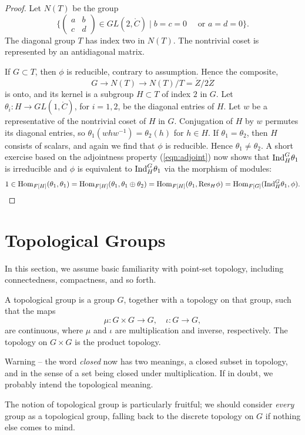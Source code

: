 \documentclass{amsart}
\def\CC{\ring{C}}
\begin{document}
\begin{proof}
Let $N(T)$ be the group 
\[
\{\begin{pmatrix} a & b \\ c & d\end{pmatrix} \in GL(2,\CC) \mid
b = c =0 \quad \text{ or } a = d = 0\}.
\]
The diagonal group $T$ has index two in $N(T)$.
The nontrivial coset is represented by an  antidiagonal matrix.

If $G\subset T$, then $\phi$ is reducible,
contrary to assumption.  Hence the composite,
\[
G\to N(T)\to N(T)/T = \ring{Z}/2\ring{Z}
\]
is onto, and its kernel is a subgroup $H\subset T$ of index $2$ in $G$.
Let
$\theta_i:H\to GL(1,\CC)$, for $i=1,2$, be the diagonal entries
of $H$.  Let $w$ be a representative of the nontrivial coset of $H$ in
$G$.  Conjugation of $H$ by $w$ permutes its diagonal entries, so
$\theta_1(w h w^{-1}) = \theta_2(h)$ for $h\in H$.  If
$\theta_1=\theta_2$, then $H$ consists of scalars, and again we find
that $\phi$ is reducible.  Hence $\theta_1\ne\theta_2$.  A short
exercise based on the adjointness property (\ref{eqn:adjoint}) now
shows that ${\operatorname{Ind}}_H^G\theta_1$ is irreducible and $\phi$ is
equivalent to ${\operatorname{Ind}}_H^G\theta_1$ via the morphism of modules:
\[
1\in{\operatorname{Hom}}_{F[H]}(\theta_1,\theta_1)={\operatorname{Hom}}_{F[H]}(\theta_1,\theta_1\oplus\theta_2)=
{\operatorname{Hom}}_{F[H]}(\theta_1,{\operatorname{Res}}_H\phi) = {\operatorname{Hom}}_{F[G]}({\operatorname{Ind}}_H^G\theta_1,\phi).
\]
\end{proof}

\newpage
\section{Topological Groups}

In this section, we assume basic familiarity with point-set topology,
including connectedness, compactness, and so forth. 

A topological group is a group $G$, together with a topology on that
group, such that the maps
\[
\mu:G\times G\to G,\quad \iota:G\to G,
\]
are continuous, where $\mu$ and $\iota$ are multiplication and
inverse, respectively.  The topology on $G\times G$ is the product
topology.

Warning -- the word {\it closed} now has two meanings, a closed subset
in topology, and in the sense of a set being closed under
multiplication.  If in doubt, we probably intend the topological
meaning.

The notion of topological group is particularly fruitful; we should
consider {\it every} group as a topological group, falling back to the
discrete topology on $G$ if nothing else comes to mind.
\end{document}
